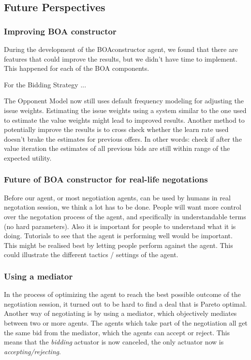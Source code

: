 \subsection{Future Perspectives}
\subsubsection{Improving BOA constructor}
During the development of the BOAconstructor agent, we found that there are features that could improve the results, but we didn't have time to implement. This happened for each of the BOA components.

For the Bidding Strategy ...

The Opponent Model now still uses default frequency modeling for adjusting the issue weights. Estimating the issue weights using a system similar to the one used to estimate the value weights might lead to improved results. Another method to potentially improve the results is to cross check whether the learn rate used doesn't brake the estimates for previous offers. In other words: check if after the value iteration the estimates of all previous bids are still within range of the expected utility. 

\subsubsection{Future of BOA constructor for real-life negotations}

Before our agent, or most negotiation agents, can be used by humans in real negotation 
session, we think a lot has to be done. People will want more control over the 
negotation process of the agent, and specifically in understandable terms (no hard parameters).
Also it is important for people to understand what it is doing. 
Tutorials to see that the agent is performing well would be important. 
This might be realised best by letting people perform against the agent. 
This could illustrate the different tactics / settings of the agent.

\subsubsection{Using a mediator}
In the process of optimizing the agent to reach the best possible outcome of the negotiation session, it turned out to be hard to find a deal that is Pareto optimal. Another way of negotiating is by using a mediator, which objectively mediates between two or more agents. The agents which take part of the negotiation all get the same bid from the mediator, which the agents can accept or reject. This means that the \textit{bidding} actuator is now canceled, the only actuator now is \textit{accepting/rejecting}.

